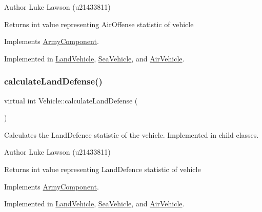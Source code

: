 \begin{DoxyAuthor}{Author}
Luke Lawson (u21433811) 
\end{DoxyAuthor}
\begin{DoxyReturn}{Returns}
int value representing Air\+Offense statistic of vehicle 
\end{DoxyReturn}


Implements \mbox{\hyperlink{class_army_component_aeea4bed9a4850e9b74f9306a8443085c}{Army\+Component}}.



Implemented in \mbox{\hyperlink{class_land_vehicle_a2453f77778b1c36b2b2fbeb19d06776e}{Land\+Vehicle}}, \mbox{\hyperlink{class_sea_vehicle_a24b41898db73af6d04ae91ddcf97f4a4}{Sea\+Vehicle}}, and \mbox{\hyperlink{class_air_vehicle_a1365cb66c2a8755e689f938c734df6c0}{Air\+Vehicle}}.

\mbox{\label{class_vehicle_a155724a3ab7689c7bafb970ad47ac0df}} 
\subsubsection{\texorpdfstring{calculateLandDefense()}{calculateLandDefense()}}
{\footnotesize\ttfamily virtual int Vehicle\+::calculate\+Land\+Defense (\begin{DoxyParamCaption}{ }\end{DoxyParamCaption})\hspace{0.3cm}{\ttfamily [pure virtual]}}



Calculates the Land\+Defence statistic of the vehicle. Implemented in child classes. 

\begin{DoxyAuthor}{Author}
Luke Lawson (u21433811) 
\end{DoxyAuthor}
\begin{DoxyReturn}{Returns}
int value representing Land\+Defence statistic of vehicle 
\end{DoxyReturn}


Implements \mbox{\hyperlink{class_army_component_a88558b28106a5d461fcc9ca2eb8e7a40}{Army\+Component}}.



Implemented in \mbox{\hyperlink{class_land_vehicle_aa294605ab1e7a30d2b62b51aa3957713}{Land\+Vehicle}}, \mbox{\hyperlink{class_sea_vehicle_a0c86a5fe86057562bb7e7547e0183c8d}{Sea\+Vehicle}}, and \mbox{\hyperlink{class_air_vehicle_acb7d32241e484f1ece2123451f061168}{Air\+Vehicle}}.

